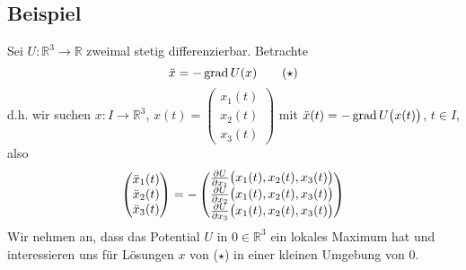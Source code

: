 \subsection[Beispiel aus der Physik (?)]{Beispiel} %
\label{sub:29}
Sei $U : \mathds{R}^3 \to \mathds{R}$ zweimal stetig differenzierbar. Betrachte 
\[
	\ddot x = - \operatorname{grad} U(x) \tag{$\star$}
\]
d.h. wir suchen $x: I \to \mathds{R}^3$, $x(t)= \begin{pmatrix}
	x_1(t) \\ x_2(t) \\ x_3(t)
\end{pmatrix}$ mit $\ddot x(t)= - \operatorname{grad} U\big(x(t)\big)$, $t \in I$, also 
\[
	\begin{pmatrix}
		\ddot x_1(t) \\ \ddot x_2(t) \\ \ddot x_3(t)
	\end{pmatrix} = - \begin{pmatrix}
		\frac{{\partial U}}{{\partial x_1}}  \big( x_1(t), x_2(t), x_3(t)\big) \\
		\frac{{\partial U}}{{\partial x_2}}  \big( x_1(t), x_2(t), x_3(t)\big) \\
		\frac{{\partial U}}{{\partial x_3}}  \big( x_1(t), x_2(t), x_3(t)\big) 
	\end{pmatrix}
\]
Wir nehmen an, dass das Potential $U$ in $0 \in \mathds{R}^3$ ein lokales Maximum hat und interessieren uns für Lösungen $x$ von ($\star$) in einer kleinen Umgebung von $0$.


